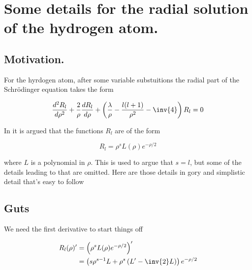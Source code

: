 
%

\chapter{Some details for the radial solution of the hydrogen atom.}
\label{chap:hyrdogenLaguerre}
{}
\date{Nov 24, 2010}

\beginArtWithToc

\section{Motivation.}

For the hyrdogen atom, after some variable substuitions the radial part of the Schr\"{o}dinger equation takes the form

\begin{equation}\label{eqn:hyrdogenLaguerre:10}
\frac{d^2 R_l}{d\rho^2} + \frac{2}{\rho} \frac{d R_l}{d\rho} + \left( \frac{\lambda}{\rho} - \frac{l(l+1)}{\rho^2} - \inv{4} \right) R_l = 0
\end{equation}

In \cite{desai2009quantum} it is argued that the functions $R_l$ are of the form

\begin{equation}\label{eqn:hyrdogenLaguerre:20}
R_l = \rho^s L(\rho) e^{-\rho/2}
\end{equation}

where $L$ is a polynomial in $\rho$.  This is used to argue that $s=l$, but some of the details leading to that are omitted.  Here are those details in gory and simplistic detail that's easy to follow

\section{Guts}

We need the first derivative to start things off

\begin{align*}
R_l(\rho)' 
&= \left( \rho^s L(\rho) e^{-\rho/2} \right)' \\
&= \left( s \rho^{s-1} L + \rho^s \left(L' - \inv{2} L\right) \right) e^{-\rho/2} \\
\end{align*}

